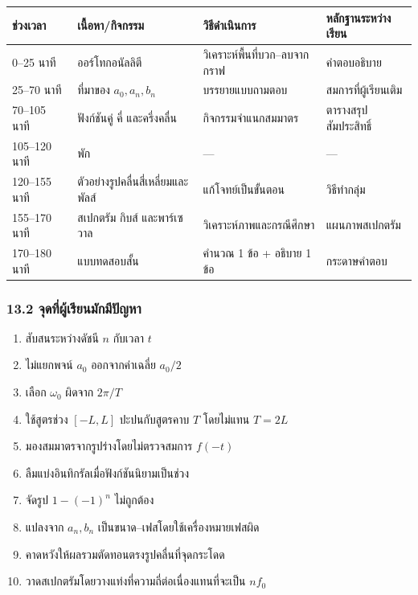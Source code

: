 \begin{table}[htbp]
    \centering
    \begin{tabularx}{\textwidth}{L{0.16\textwidth} Y Y Y}
        \hline
        \textbf{ช่วงเวลา} & \textbf{เนื้อหา/กิจกรรม} & \textbf{วิธีดำเนินการ} & \textbf{หลักฐานระหว่างเรียน} \\
        --25 นาที & ออร์โทกอนัลลิตี & วิเคราะห์พื้นที่บวก--ลบจากกราฟ & คำตอบอธิบาย \\
        25--70 นาที & ที่มาของ \(a_0,a_n,b_n\) & บรรยายแบบถามตอบ & สมการที่ผู้เรียนเติม \\
        70--105 นาที & ฟังก์ชันคู่ คี่ และครึ่งคลื่น & กิจกรรมจำแนกสมมาตร & ตารางสรุปสัมประสิทธิ์ \\
        105--120 นาที & พัก & --- & --- \\
        120--155 นาที & ตัวอย่างรูปคลื่นสี่เหลี่ยมและพัลส์ & แก้โจทย์เป็นขั้นตอน & วิธีทำกลุ่ม \\
        155--170 นาที & สเปกตรัม กิบส์ และพาร์เซวาล & วิเคราะห์ภาพและกรณีศึกษา & แผนภาพสเปกตรัม \\
        170--180 นาที & แบบทดสอบสั้น & คำนวณ 1 ข้อ + อธิบาย 1 ข้อ & กระดาษคำตอบ \\
        \hline
    \end{tabularx}
\end{table}

\subsubsection{13.2 จุดที่ผู้เรียนมักมีปัญหา}

\begin{enumerate}
\def\labelenumi{\arabic{enumi}.}
\item
  สับสนระหว่างดัชนี \(n\) กับเวลา \(t\)
\item
  ไม่แยกพจน์ \(a_0\) ออกจากค่าเฉลี่ย \(a_0/2\)
\item
  เลือก \(\omega_0\) ผิดจาก \(2\pi/T\)
\item
  ใช้สูตรช่วง \([-L,L]\) ปะปนกับสูตรคาบ \(T\) โดยไม่แทน \(T=2L\)
\item
  มองสมมาตรจากรูปร่างโดยไม่ตรวจสมการ \(f(-t)\)
\item
  ลืมแบ่งอินทิกรัลเมื่อฟังก์ชันนิยามเป็นช่วง
\item
  จัดรูป \(1-(-1)^n\) ไม่ถูกต้อง
\item
  แปลงจาก \(a_n,b_n\) เป็นขนาด--เฟสโดยใช้เครื่องหมายเฟสผิด
\item
  คาดหวังให้ผลรวมตัดทอนตรงรูปคลื่นที่จุดกระโดด
\item
  วาดสเปกตรัมโดยวางแท่งที่ความถี่ต่อเนื่องแทนที่จะเป็น \(nf_0\)
\end{enumerate}


